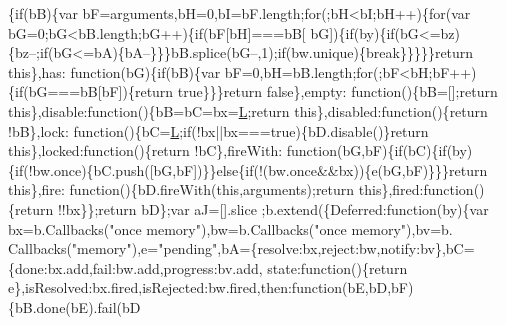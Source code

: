 \begin{DoxyCode}
      \{\textcolor{keywordflow}{if}(bB)\{var bF=arguments,bH=0,bI=bF.length;\textcolor{keywordflow}{for}(;bH<bI;bH++)\{\textcolor{keywordflow}{for}(var bG=0;bG<bB.length;bG++)\{\textcolor{keywordflow}{if}(bF[bH]===bB[
      bG])\{\textcolor{keywordflow}{if}(by)\{\textcolor{keywordflow}{if}(bG<=bz)\{bz--;\textcolor{keywordflow}{if}(bG<=bA)\{bA--\}\}\}bB.splice(bG--,1);\textcolor{keywordflow}{if}(bw.unique)\{\textcolor{keywordflow}{break}\}\}\}\}\}\textcolor{keywordflow}{return} \textcolor{keyword}{this}\},has:\textcolor{keyword}{
      function}(bG)\{\textcolor{keywordflow}{if}(bB)\{var bF=0,bH=bB.length;\textcolor{keywordflow}{for}(;bF<bH;bF++)\{\textcolor{keywordflow}{if}(bG===bB[bF])\{\textcolor{keywordflow}{return} \textcolor{keyword}{true}\}\}\}\textcolor{keywordflow}{return} \textcolor{keyword}{false}\},empty:\textcolor{keyword}{
      function}()\{bB=[];\textcolor{keywordflow}{return} \textcolor{keyword}{this}\},disable:\textcolor{keyword}{function}()\{bB=bC=bx=\hyperlink{jquery_8js_a38ee4c0b5f4fe2a18d0c783af540d253}{L};\textcolor{keywordflow}{return} \textcolor{keyword}{this}\},disabled:\textcolor{keyword}{function}()\{\textcolor{keywordflow}{return} !bB\},lock:\textcolor{keyword}{
      function}()\{bC=\hyperlink{jquery_8js_a38ee4c0b5f4fe2a18d0c783af540d253}{L};\textcolor{keywordflow}{if}(!bx||bx===\textcolor{keyword}{true})\{bD.disable()\}\textcolor{keywordflow}{return} \textcolor{keyword}{this}\},locked:\textcolor{keyword}{function}()\{\textcolor{keywordflow}{return} !bC\},fireWith:\textcolor{keyword}{
      function}(bG,bF)\{\textcolor{keywordflow}{if}(bC)\{\textcolor{keywordflow}{if}(by)\{\textcolor{keywordflow}{if}(!bw.once)\{bC.push([bG,bF])\}\}\textcolor{keywordflow}{else}\{\textcolor{keywordflow}{if}(!(bw.once&&bx))\{e(bG,bF)\}\}\}\textcolor{keywordflow}{return} \textcolor{keyword}{this}\},fire:\textcolor{keyword}{
      function}()\{bD.fireWith(\textcolor{keyword}{this},arguments);\textcolor{keywordflow}{return} \textcolor{keyword}{this}\},fired:\textcolor{keyword}{function}()\{\textcolor{keywordflow}{return} !!bx\}\};\textcolor{keywordflow}{return} bD\};var aJ=[].slice
      ;b.extend(\{Deferred:\textcolor{keyword}{function}(by)\{var bx=b.Callbacks(\textcolor{stringliteral}{"once memory"}),bw=b.Callbacks(\textcolor{stringliteral}{"once memory"}),bv=b.
      Callbacks(\textcolor{stringliteral}{"memory"}),e=\textcolor{stringliteral}{"pending"},bA=\{resolve:bx,reject:bw,notify:bv\},bC=\{done:bx.add,fail:bw.add,progress:bv.add,
      state:\textcolor{keyword}{function}()\{\textcolor{keywordflow}{return} e\},isResolved:bx.fired,isRejected:bw.fired,then:\textcolor{keyword}{function}(bE,bD,bF)\{bB.done(bE).fail(bD

\end{DoxyCode}

